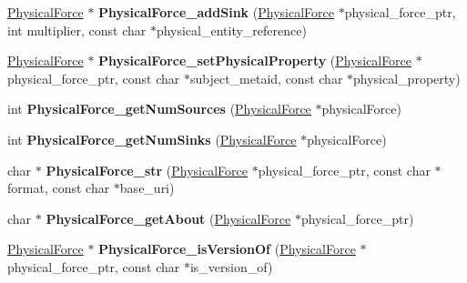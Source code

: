 \begin{DoxyCompactItemize}
\hyperlink{classomexmeta_1_1PhysicalForce}{Physical\+Force} $\ast$ {\bfseries Physical\+Force\+\_\+add\+Sink} (\hyperlink{classomexmeta_1_1PhysicalForce}{Physical\+Force} $\ast$physical\+\_\+force\+\_\+ptr, int multiplier, const char $\ast$physical\+\_\+entity\+\_\+reference)
\item 
\mbox{\label{namespaceomexmeta_a3942ac5b5d7393eea5f0644c2f31cbc5}} 
\hyperlink{classomexmeta_1_1PhysicalForce}{Physical\+Force} $\ast$ {\bfseries Physical\+Force\+\_\+set\+Physical\+Property} (\hyperlink{classomexmeta_1_1PhysicalForce}{Physical\+Force} $\ast$physical\+\_\+force\+\_\+ptr, const char $\ast$subject\+\_\+metaid, const char $\ast$physical\+\_\+property)
\item 
\mbox{\label{namespaceomexmeta_aae66100eb98adbc738a6476dcb018e8f}} 
int {\bfseries Physical\+Force\+\_\+get\+Num\+Sources} (\hyperlink{classomexmeta_1_1PhysicalForce}{Physical\+Force} $\ast$physical\+Force)
\item 
\mbox{\label{namespaceomexmeta_a1bec2b6579c0eba8a719f68d39b09c2e}} 
int {\bfseries Physical\+Force\+\_\+get\+Num\+Sinks} (\hyperlink{classomexmeta_1_1PhysicalForce}{Physical\+Force} $\ast$physical\+Force)
\item 
\mbox{\label{namespaceomexmeta_a8a3f3cf23e3c5253f0a92f6374a2059b}} 
char $\ast$ {\bfseries Physical\+Force\+\_\+str} (\hyperlink{classomexmeta_1_1PhysicalForce}{Physical\+Force} $\ast$physical\+\_\+force\+\_\+ptr, const char $\ast$format, const char $\ast$base\+\_\+uri)
\item 
\mbox{\label{namespaceomexmeta_a4428467ced5ab11c48a3b16284048a36}} 
char $\ast$ {\bfseries Physical\+Force\+\_\+get\+About} (\hyperlink{classomexmeta_1_1PhysicalForce}{Physical\+Force} $\ast$physical\+\_\+force\+\_\+ptr)
\item 
\mbox{\label{namespaceomexmeta_af046e4eed3949643feca6decaa570340}} 
\hyperlink{classomexmeta_1_1PhysicalForce}{Physical\+Force} $\ast$ {\bfseries Physical\+Force\+\_\+is\+Version\+Of} (\hyperlink{classomexmeta_1_1PhysicalForce}{Physical\+Force} $\ast$physical\+\_\+force\+\_\+ptr, const char $\ast$is\+\_\+version\+\_\+of)
\item 
\mbox{\label{namespaceomexmeta_aaf31dd28c34186769fa91c5c5bd205b6}} 

\end{DoxyCompactItemize}

